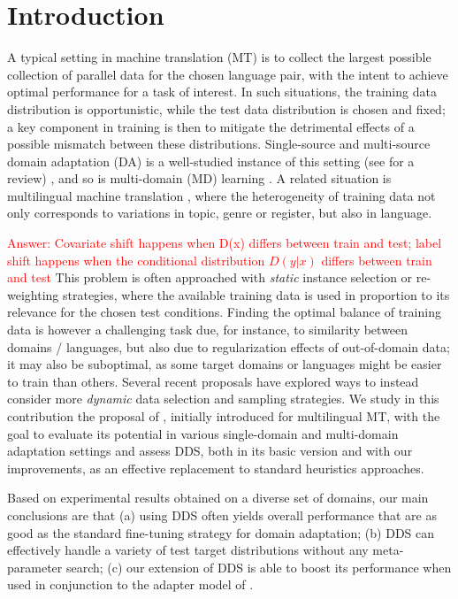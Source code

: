 \documentclass[11pt,a4paper]{article}
\newcommand{\fyTodo}[1]{\Todo[FY:]{\textcolor{orange}{#1}}}
\newcommand{\revision}[1]{\textcolor{red}{#1}}
\begin{document}
\section{Introduction}\label{sec:intro}
A typical setting in machine translation (MT) is to collect the largest possible collection of parallel data for the chosen language pair, with the intent to achieve optimal performance for a task of interest. In such situations, the training data distribution is opportunistic, while the test data distribution is chosen and fixed; a key component in training is then to mitigate the detrimental effects of a possible mismatch between these distributions. Single-source and multi-source domain adaptation (DA) is a well-studied instance of this setting (see \citep{Chu2017comparison} for a review) , and so is multi-domain (MD) learning \cite{Chu18multilingual,Zeng18multidomain,Jiang19multidomain,Pham21revisiting}. A related situation is multilingual machine translation \cite{Firat16multiway,Ha16towards,Johnson17google,Arivazhagan19massively}\fyTodo{Add more recent work}, where the heterogeneity of training data not only corresponds to variations in topic, genre or register, but also in language.

\fyTodo{Label or covariate shift?} \revision{Answer: Covariate shift happens when D(x) differs between train and test; label shift happens when the conditional distribution $D(y|x)$ differs between train and test} 
This problem is often approached with \emph{static} instance selection or re-weighting strategies, where the available training data is used in proportion to its relevance for the chosen test conditions. Finding the optimal balance of training data is however a challenging task due, for instance, to similarity between domains / languages, but also due to regularization effects of out-of-domain data; it may also be suboptimal, as some target domains or languages might be easier to train than others. Several recent proposals \cite{Wang17instance,Zhang19curriculum,Kumar19reinforcement,Wang20learning-multi} have explored ways to instead consider more \emph{dynamic} data selection and sampling strategies. We study in this contribution the proposal of \citet{Wang20balancing}, initially introduced for multilingual MT, with the goal to evaluate its potential in various single-domain and multi-domain adaptation settings and assess DDS, both in its basic version and with our improvements, as an effective replacement to standard heuristics approaches.

Based on experimental results obtained on a diverse set of domains, our main conclusions are that (a) using DDS often yields overall performance that are as good as the standard fine-tuning strategy for domain adaptation; (b) DDS can effectively handle a variety of test target distributions without any meta-parameter search; (c) our extension of DDS is able to boost its performance when used in conjunction to the adapter model of \citet{Bapna19simple}.
\end{document}
